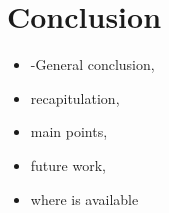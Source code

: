 \section*{Conclusion}
\begin{itemize}
    \item -General conclusion,
    \item recapitulation,
    \item main points,
    \item future work,
    \item where is available
\end{itemize}